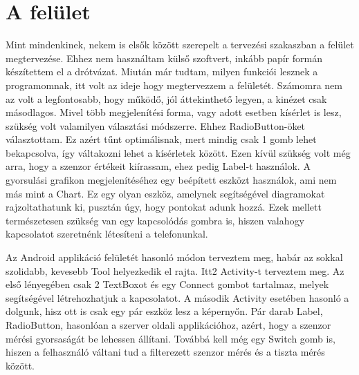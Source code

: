 \documentclass{thesis-ekf}
\theoremstyle{definition}
\theoremstyle{remark}
\begin{document}
\section{A felület}
Mint mindenkinek, nekem is elsők között szerepelt a tervezési szakaszban a felület megtervezése. Ehhez nem használtam külső szoftvert, inkább papír formán készítettem el a drótvázat. Miután már tudtam, milyen funkciói lesznek a programomnak, itt volt az ideje hogy megtervezzem a felületét. Számomra nem az volt a legfontosabb, hogy működő, jól áttekinthető legyen, a kinézet csak másodlagos. Mivel több megjelenítési forma, vagy adott esetben kísérlet is lesz, szükség volt valamilyen választási módszerre. Ehhez RadioButton-öket választottam. Ez azért tűnt optimálisnak, mert mindig csak 1 gomb lehet bekapcsolva, így váltakozni lehet a kísérletek között. Ezen kívül szükség volt még arra, hogy a szenzor értékeit kiírassam, ehez pedig Label-t használok. A gyorsulási grafikon megjelenítéséhez egy beépített eszközt használok, ami nem más mint a Chart. Ez egy olyan eszköz, amelynek segítségével diagramokat rajzoltathatunk ki, pusztán úgy, hogy pontokat adunk hozzá.
Ezek mellett természetesen szükség van egy kapcsolódás gombra is, hiszen valahogy kapcsolatot szeretnénk létesíteni a telefonunkal.
\par Az Android applikáció felületét hasonló módon terveztem meg, habár az sokkal szolidabb, kevesebb Tool helyezkedik el rajta. Itt2 Activity-t terveztem meg. Az első lényegében csak 2 TextBoxot és egy Connect gombot tartalmaz, melyek segítségével létrehozhatjuk a kapcsolatot. A második Activity esetében hasonló a dolgunk, hisz ott is csak egy pár eszköz lesz a képernyőn. Pár darab Label, RadioButton, hasonlóan a szerver oldali applikációhoz, azért, hogy a szenzor mérési gyorsaságát be lehessen állítani. Továbbá kell még egy Switch gomb is, hiszen a felhasználó váltani tud a filterezett szenzor mérés és a tiszta mérés között. 
\end{document}
